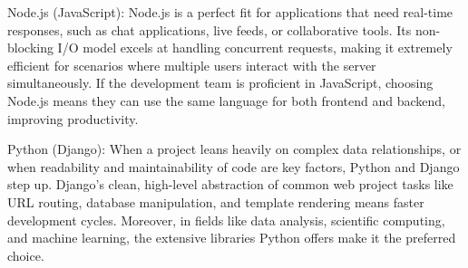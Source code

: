 \documentclass[a4paper, 11pt]{report}
\begin{document}
Node.js (JavaScript): Node.js is a perfect fit for applications that need real-time responses, such as chat applications, live feeds, or collaborative tools. Its non-blocking I/O model excels at handling concurrent requests, making it extremely efficient for scenarios where multiple users interact with the server simultaneously. If the development team is proficient in JavaScript, choosing Node.js means they can use the same language for both frontend and backend, improving productivity.

Python (Django): When a project leans heavily on complex data relationships, or when readability and maintainability of code are key factors, Python and Django step up. Django’s clean, high-level abstraction of common web project tasks like URL routing, database manipulation, and template rendering means faster development cycles. Moreover, in fields like data analysis, scientific computing, and machine learning, the extensive libraries Python offers make it the preferred choice.



\newpage


\end{document}
